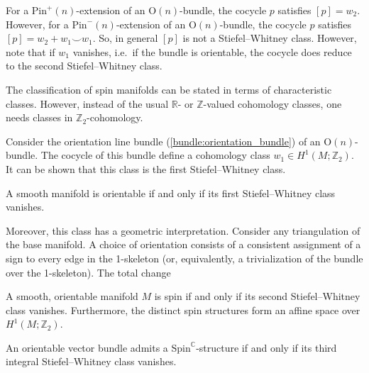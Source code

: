     \begin{property}
        For a $\mathrm{Pin}^+(n)$-extension of an $\mathrm{O}(n)$-bundle, the cocycle $p$ satisfies $[p]=w_2$. However, for a $\mathrm{Pin}^-(n)$-extension of an $\mathrm{O}(n)$-bundle, the cocycle $p$ satisfies $[p]=w_2+w_1\smile w_1$. So, in general $[p]$ is not a Stiefel--Whitney class. However, note that if $w_1$ vanishes, i.e.~if the bundle is orientable, the cocycle does reduce to the second Stiefel--Whitney class.
    \end{property}

    The classification of spin manifolds can be stated in terms of characteristic classes. However, instead of the usual $\mathbb{R}$- or $\mathbb{Z}$-valued cohomology classes, one needs classes in $\mathbb{Z}_2$-cohomology.
    \begin{property}
        Consider the orientation line bundle (\cref{bundle:orientation_bundle}) of an $\mathrm{O}(n)$-bundle. The cocycle of this bundle define a cohomology class $w_1\in H^1(M;\mathbb{Z}_2)$. It can be shown that this class is the first Stiefel--Whitney class.
    \end{property}
    \begin{result}[Orientability]
        A smooth manifold is orientable if and only if its first Stiefel--Whitney class vanishes.

        Moreover, this class has a geometric interpretation. Consider any triangulation of the base manifold. A choice of orientation consists of a consistent assignment of a sign to every edge in the 1-skeleton (or, equivalently, a trivialization of the bundle over the 1-skeleton). The total change

    \end{result}

    \begin{property}\label{riemann:spin_stiefel_whitney}
        A smooth, orientable manifold $M$ is spin if and only if its second Stiefel--Whitney class vanishes. Furthermore, the distinct spin structures form an affine space over $H^1(M;\mathbb{Z}_2)$.
    \end{property}

    \begin{property}\label{riemann:spin_c}
        An orientable vector bundle admits a $\mathrm{Spin}^{\mathbb{C}}$-structure if and only if its third integral Stiefel--Whitney class vanishes.
    \end{property}

